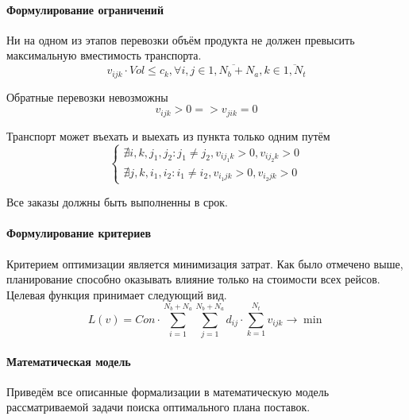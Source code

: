 	\paragraph{Формулирование ограничений}     
	
	Ни на одном из этапов перевозки объём продукта не должен превысить максимальную вместимость транспорта.
	\begin{equation}
		v_{ijk} \cdot Vol \le c_k, \forall i, j \in \overline{1, N_b+N_a}, k \in \overline{1, N_t}
	\end{equation}

	Обратные перевозки невозможны
	\begin{equation}
		v_{ijk} > 0 => v_{jik} = 0
	\end{equation}

	Транспорт может въехать и выехать из пункта только одним путём
	\begin{equation}
		\left\lbrace 
		\begin{array}{cols}
			\nexists i, k, j_1, j_2: j_1 \ne j_2, v_{ij_1k} > 0, v_{ij_2k} > 0 \\
			\nexists j, k, i_1, i_2: i_1 \ne i_2, v_{i_1jk} > 0, v_{i_2jk} > 0 
		\end{array}
	\end{equation}

	Все заказы должны быть выполненны в срок.	
	
	\paragraph{Формулирование критериев}   
	Критерием оптимизации является минимизация затрат. Как было отмечено выше, планирование способно оказывать влияние только на стоимости всех рейсов. Целевая функция принимает следующий вид.
	\begin{equation}
		L(v) = Con \cdot \sum_{i=1}^{N_b+N_a} \sum_{j=1}^{N_b+N_a} d_{ij} \cdot \sum_{k=1}^{N_t} v_{ijk} \to \min
	\end{equation}

	\paragraph{Математическая модель}
	Приведём все описанные формализации в математическую модель рассматриваемой задачи поиска оптимального плана поставок.
	
